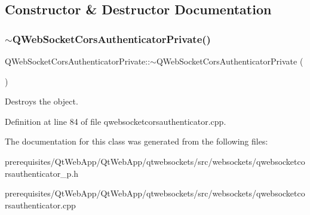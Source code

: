 \subsection{Constructor \& Destructor Documentation}
\mbox{\label{class_q_web_socket_cors_authenticator_private_a2335f695fd9de6dc3c72a4574fff8ac7}} 
\subsubsection{\texorpdfstring{$\sim$\+Q\+Web\+Socket\+Cors\+Authenticator\+Private()}{~QWebSocketCorsAuthenticatorPrivate()}}
{\footnotesize\ttfamily Q\+Web\+Socket\+Cors\+Authenticator\+Private\+::$\sim$\+Q\+Web\+Socket\+Cors\+Authenticator\+Private (\begin{DoxyParamCaption}{ }\end{DoxyParamCaption})}

Destroys the object. 

Definition at line 84 of file qwebsocketcorsauthenticator.\+cpp.



The documentation for this class was generated from the following files\+:\begin{DoxyCompactItemize}
\item 
prerequisites/\+Qt\+Web\+App/\+Qt\+Web\+App/qtwebsockets/src/websockets/qwebsocketcorsauthenticator\+\_\+p.\+h\item 
prerequisites/\+Qt\+Web\+App/\+Qt\+Web\+App/qtwebsockets/src/websockets/qwebsocketcorsauthenticator.\+cpp\end{DoxyCompactItemize}
